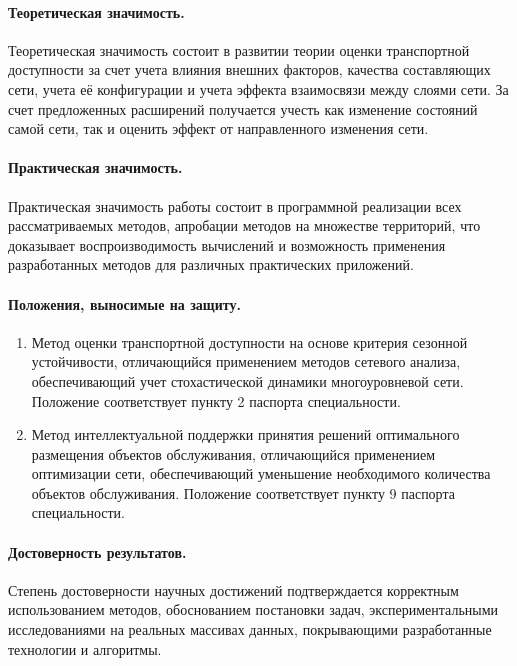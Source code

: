 \documentclass[14pt,a4paper]{extarticle}
\begin{document}
\paragraph*{Теоретическая значимость.}

Теоретическая значимость состоит в развитии теории оценки транспортной доступности за счет учета влияния внешних факторов, качества составляющих сети, учета её конфигурации и учета эффекта взаимосвязи между слоями сети. За счет предложенных расширений получается учесть как изменение состояний самой сети, так и оценить эффект от направленного изменения сети.

\paragraph*{Практическая значимость.}
Практическая значимость работы состоит в программной реализации всех рассматриваемых методов, апробации методов на множестве территорий, что доказывает воспроизводимость вычислений и возможность применения разработанных методов для различных практических приложений.

\paragraph*{Положения, выносимые на защиту.}
\begin{enumerate}
    \item Метод оценки транспортной доступности на основе критерия сезонной устойчивости, отличающийся применением методов сетевого анализа, обеспечивающий учет стохастической динамики многоуровневой сети. Положение соответствует пункту 2 паспорта специальности.
    \item Метод интеллектуальной поддержки принятия решений оптимального размещения объектов обслуживания, отличающийся применением оптимизации сети, обеспечивающий уменьшение необходимого количества объектов обслуживания. Положение соответствует пункту 9 паспорта специальности.
\end{enumerate}

\paragraph*{Достоверность результатов.}
Степень достоверности научных достижений подтверждается корректным использованием методов, обоснованием постановки задач, экспериментальными исследованиями на реальных массивах данных, покрывающими разработанные технологии и алгоритмы.
\end{document}
